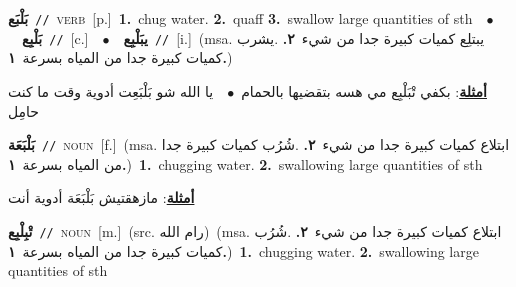 \documentclass[10pt,a4paper,twoside]{article} %
\begin{document}
\begin{multicols}{2}
{\setlength\topsep{0pt}\textbf{\foreignlanguage{arabic}{بَلْبَع}}\ {\color{gray}\texttt{//}\color{black}}\ \textsc{verb}\ [p.]\ \textbf{1.}~chug water.  \textbf{2.}~quaff  \textbf{3.}~swallow large quantities of sth\ \ $\bullet$\ \ \setlength\topsep{0pt}\textbf{\foreignlanguage{arabic}{بَلْبِع}}\ {\color{gray}\texttt{//}\color{black}}\ [c.]\ \ $\bullet$\ \ \setlength\topsep{0pt}\textbf{\foreignlanguage{arabic}{يبَلْبِع}}\ {\color{gray}\texttt{//}\color{black}}\ [i.]\ \color{gray}(msa. \foreignlanguage{arabic}{يبتلِع كميات كبيرة جدا من شيء}~\foreignlanguage{arabic}{\textbf{٢.}}  .\foreignlanguage{arabic}{يشرب كميات كبيرة جدا من المياه بسرعة}~\foreignlanguage{arabic}{\textbf{١.}})\color{black}\  \begin{flushright}\color{gray}\foreignlanguage{arabic}{\textbf{\underline{\foreignlanguage{arabic}{أمثلة}}}: بكفي تْبَلْبِع مي هسه بتقضيها بالحمام\ $\bullet$\ \  يا الله شو بَلْبَعِت أدوية وقت ما كنت حامِل}\end{flushright}\color{black}} \vspace{2mm}

{\setlength\topsep{0pt}\textbf{\foreignlanguage{arabic}{بَلْبَعَة}}\ {\color{gray}\texttt{//}\color{black}}\ \textsc{noun}\ [f.]\ \color{gray}(msa. \foreignlanguage{arabic}{ابتلاع كميات كبيرة جدا من شيء}~\foreignlanguage{arabic}{\textbf{٢.}}  .\foreignlanguage{arabic}{شُرُب كميات كبيرة جدا من المياه بسرعة}~\foreignlanguage{arabic}{\textbf{١.}})\color{black}\ \textbf{1.}~chugging water.  \textbf{2.}~swallowing large quantities of sth\  \begin{flushright}\color{gray}\foreignlanguage{arabic}{\textbf{\underline{\foreignlanguage{arabic}{أمثلة}}}: مازهقتيش بَلْبَعَة أدوية أنت}\end{flushright}\color{black}} \vspace{2mm}

{\setlength\topsep{0pt}\textbf{\foreignlanguage{arabic}{تْبِلْبِع}}\ {\color{gray}\texttt{//}\color{black}}\ \textsc{noun}\ [m.]\ (src. \color{gray}\foreignlanguage{arabic}{رام الله}\color{black})\ \color{gray}(msa. \foreignlanguage{arabic}{ابتلاع كميات كبيرة جدا من شيء}~\foreignlanguage{arabic}{\textbf{٢.}}  .\foreignlanguage{arabic}{شُرُب كميات كبيرة جدا من المياه بسرعة}~\foreignlanguage{arabic}{\textbf{١.}})\color{black}\ \textbf{1.}~chugging water.  \textbf{2.}~swallowing large quantities of sth\ } \vspace{2mm}


\end{multicols}
\end{document}
